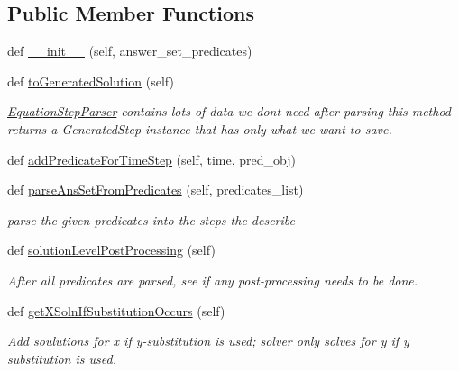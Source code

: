 \subsection*{Public Member Functions}
\begin{DoxyCompactItemize}
\item 
def \hyperlink{classtotally__new__visualizer_1_1_problem_parser_a8c74392fb4a04b5c3215fa594c1a223d}{\+\_\+\+\_\+init\+\_\+\+\_\+} (self, answer\+\_\+set\+\_\+predicates)
\item 
def \hyperlink{classtotally__new__visualizer_1_1_problem_parser_ada04c87da73191c9d9dd21f4bc7adbb9}{to\+Generated\+Solution} (self)
\begin{DoxyCompactList}\small\item\em \hyperlink{classtotally__new__visualizer_1_1_equation_step_parser}{Equation\+Step\+Parser} contains lots of data we don\textquotesingle{}t need after parsing this method returns a Generated\+Step instance that has only what we want to save. \end{DoxyCompactList}\item 
def \hyperlink{classtotally__new__visualizer_1_1_problem_parser_a3c480d50bf72818a2db48543b431bcbc}{add\+Predicate\+For\+Time\+Step} (self, time, pred\+\_\+obj)
\item 
def \hyperlink{classtotally__new__visualizer_1_1_problem_parser_a9ebe340d4c51febfe4b32a167d97e353}{parse\+Ans\+Set\+From\+Predicates} (self, predicates\+\_\+list)
\begin{DoxyCompactList}\small\item\em parse the given predicates into the steps the describe \end{DoxyCompactList}\item 
def \hyperlink{classtotally__new__visualizer_1_1_problem_parser_ae641da32655919b48a93bb263a565157}{solution\+Level\+Post\+Processing} (self)
\begin{DoxyCompactList}\small\item\em After all predicates are parsed, see if any post-\/processing needs to be done. \end{DoxyCompactList}\item 
def \hyperlink{classtotally__new__visualizer_1_1_problem_parser_aac1f2db24f810523852a67dbb69bfe5f}{get\+X\+Soln\+If\+Substitution\+Occurs} (self)
\begin{DoxyCompactList}\small\item\em Add soulutions for x if y-\/substitution is used; solver only solves for y if y substitution is used. \end{DoxyCompactList}\item 

\end{DoxyCompactItemize}
